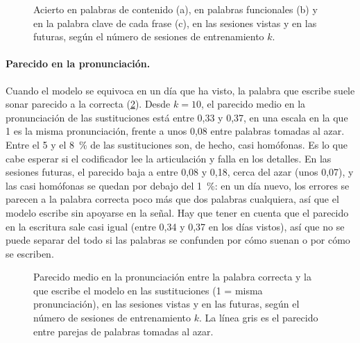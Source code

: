\begin{figure}[htbp]
  \centering
  \caption{Acierto en palabras de contenido (a), en palabras funcionales (b) y en la palabra clave de cada frase (c), en las sesiones vistas y en las futuras, según el número de sesiones de entrenamiento $k$.}
  \label{fig:res-evolucion}
\end{figure}

\paragraph{Parecido en la pronunciación.} Cuando el modelo se equivoca en un día que ha visto, la palabra que escribe suele sonar parecido a la correcta (\cref{fig:res-pronunciacion}). Desde $k = 10$, el parecido medio en la pronunciación de las sustituciones está entre 0,33 y 0,37, en una escala en la que 1 es la misma pronunciación, frente a unos 0,08 entre palabras tomadas al azar. Entre el 5 y el 8~\% de las sustituciones son, de hecho, casi homófonas. Es lo que cabe esperar si el codificador lee la articulación y falla en los detalles. En las sesiones futuras, el parecido baja a entre 0,08 y 0,18, cerca del azar (unos 0,07), y las casi homófonas se quedan por debajo del 1~\%: en un día nuevo, los errores se parecen a la palabra correcta poco más que dos palabras cualquiera, así que el modelo escribe sin apoyarse en la señal. Hay que tener en cuenta que el parecido en la escritura sale casi igual (entre 0,34 y 0,37 en los días vistos), así que no se puede separar del todo si las palabras se confunden por cómo suenan o por cómo se escriben.

\begin{figure}[htbp]
  \centering
  \caption{Parecido medio en la pronunciación entre la palabra correcta y la que escribe el modelo en las sustituciones (1 = misma pronunciación), en las sesiones vistas y en las futuras, según el número de sesiones de entrenamiento $k$. La línea gris es el parecido entre parejas de palabras tomadas al azar.}
  \label{fig:res-pronunciacion}
\end{figure}

